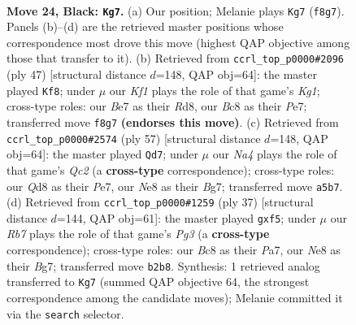 \documentclass[11pt]{article}
\begin{document}
\clearpage

\begin{figure}[p]\centering
\begin{subfigure}{0.46\textwidth}\centering
\resizebox{\linewidth}{!}{%
\newchessgame
\chessboard[
  setfen={2bqnkr1/4bp2/p5p1/n1BBp2p/P3P3/3PQ2N/1rP1RPPP/RN4K1 b - - 1 24},
  showmover=false,
  pgfstyle=straightmove, color=movearrow, markmove={f8-g7}
]}
\caption{}
\end{subfigure}\hfill
\begin{subfigure}{0.46\textwidth}\centering
\resizebox{\linewidth}{!}{%
\newchessgame
\chessboard[
  setfen={3r2k1/3qppb1/pp3n1p/4pPp1/3rN3/P2B1QPP/1PP2PK1/3RR3 b - - 0 24},
  showmover=false,
  pgfstyle=straightmove, color=movearrow, markmove={g8-f8}
]}
\caption{}
\end{subfigure}
\\[4pt]
\begin{subfigure}{0.46\textwidth}\centering
\resizebox{\linewidth}{!}{%
\newchessgame
\chessboard[
  setfen={3r2k1/2q1ppb1/p4n1p/1p2pPp1/3rN3/P2B1QPP/1PP1RPK1/3R4 b - - 13 29},
  showmover=false,
  pgfstyle=straightmove, color=movearrow, markmove={c7-d7}
]}
\caption{}
\end{subfigure}\hfill
\begin{subfigure}{0.46\textwidth}\centering
\resizebox{\linewidth}{!}{%
\newchessgame
\chessboard[
  setfen={3q1rk1/pp4b1/3p1np1/3PpBBp/2r4P/2N2P2/PP1Q2P1/1K1R3R b - - 0 19},
  showmover=false,
  pgfstyle=straightmove, color=movearrow, markmove={g6-f5}
]}
\caption{}
\end{subfigure}
\caption{\textbf{Move 24, Black: \texttt{Kg7}.} (a) Our position; Melanie plays \texttt{Kg7} (\texttt{f8g7}). Panels (b)--(d) are the retrieved master positions whose correspondence most drove this move (highest QAP objective among those that transfer to it). (b) Retrieved from \texttt{ccrl\_top\_p0000\#2096} (ply 47) [structural distance $d$=148, QAP obj=64]: the master played \texttt{Kf8}; under $\mu$ our \emph{Kf1} plays the role of that game's \emph{Kg1}; cross-type roles: our \emph{B}e7 as their \emph{R}d8, our \emph{B}c8 as their \emph{P}e7; transferred move \texttt{f8g7} \textbf{(endorses this move)}. (c) Retrieved from \texttt{ccrl\_top\_p0000\#2574} (ply 57) [structural distance $d$=148, QAP obj=64]: the master played \texttt{Qd7}; under $\mu$ our \emph{Na4} plays the role of that game's \emph{Qc2} (a \textbf{cross-type} correspondence); cross-type roles: our \emph{Q}d8 as their \emph{P}e7, our \emph{N}e8 as their \emph{B}g7; transferred move \texttt{a5b7}. (d) Retrieved from \texttt{ccrl\_top\_p0000\#1259} (ply 37) [structural distance $d$=144, QAP obj=61]: the master played \texttt{gxf5}; under $\mu$ our \emph{Rb7} plays the role of that game's \emph{Pg3} (a \textbf{cross-type} correspondence); cross-type roles: our \emph{B}c8 as their \emph{P}a7, our \emph{N}e8 as their \emph{B}g7; transferred move \texttt{b2b8}. Synthesis: 1 retrieved analog transferred to \texttt{Kg7} (summed QAP objective 64, the strongest correspondence among the candidate moves); Melanie committed it via the \texttt{search} selector.}
\label{fig:thought-m47}
\end{figure}
\end{document}
